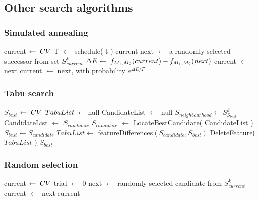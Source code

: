 \documentclass{beamer}
\begin{document}
\subsection{Other search algorithms}

\begin{frame}[allowframebreaks]
\frametitle{Simulated annealing}
  \begin{algorithmic}[1]
      \State current $\gets \thickspace CV$
        \State T $\gets$ schedule( t )
          \State \Return current
        \EndIf
        \State next $\gets$ a randomly selected successor from set $S^{k}_{current}$
        \State $\Delta E \gets  \thickspace f_{M_{1}, M_{2}}(current) - f_{M_{1}, M_{2}}(next)$
          \State current $\gets$ next
        \Else
          \State current $\gets$ next, with probability $e^{\Delta E / T}$
        \EndIf
      \EndFor
    \EndFunction
  \end{algorithmic}
\end{frame}

\begin{frame}[allowframebreaks]
\frametitle{Tabu search}
  \begin{algorithmic}[1]
      \State $S_{best}$ $\gets \thickspace CV$
      \State $TabuList \thickspace \gets$ null
        \State CandidateList $\gets$ null
        \State $S_{neighbourhood} \gets S^{k}_{S_{best}}$
            \State CandidateList $\gets$ $S_{candidate}$
          \EndIf
        \EndFor
        \State $S_{candidate}$ $\gets$ LocateBestCandidate( CandidateList )
          \State $S_{best} \gets S_{candidate}$
          \State $TabuList \gets$ featureDifferences$(S_{candidate}, S_{best})$
            \State DeleteFeature( $TabuList$ )
          \EndWhile
        \EndIf
      \EndWhile 
      \State \Return $S_{best}$
    \EndFunction
  \end{algorithmic}
\end{frame}

\begin{frame}[allowframebreaks]
\frametitle{Random selection}
  \begin{algorithmic}[1]
      \State current $\gets \thickspace CV$
      \State trial $\gets$ 0
        \State next $\gets$ randomly selected candidate from $S^{k}_{current}$
          \State current $\gets$ next
        \EndIf
      \EndWhile 
      \State \Return current
    \EndFunction
  \end{algorithmic}
\end{frame}
\end{document}
